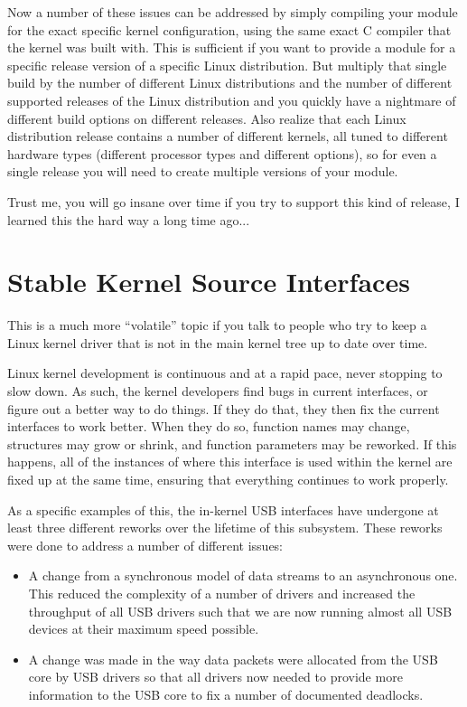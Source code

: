 \documentclass[a4paper,8pt,english]{sphinxmanual}
\begin{document}
Now a number of these issues can be addressed by simply compiling your
module for the exact specific kernel configuration, using the same exact
C compiler that the kernel was built with.  This is sufficient if you
want to provide a module for a specific release version of a specific
Linux distribution.  But multiply that single build by the number of
different Linux distributions and the number of different supported
releases of the Linux distribution and you quickly have a nightmare of
different build options on different releases.  Also realize that each
Linux distribution release contains a number of different kernels, all
tuned to different hardware types (different processor types and
different options), so for even a single release you will need to create
multiple versions of your module.

Trust me, you will go insane over time if you try to support this kind
of release, I learned this the hard way a long time ago...


\section{Stable Kernel Source Interfaces}
\label{process/stable-api-nonsense:stable-kernel-source-interfaces}
This is a much more ``volatile'' topic if you talk to people who try to
keep a Linux kernel driver that is not in the main kernel tree up to
date over time.

Linux kernel development is continuous and at a rapid pace, never
stopping to slow down.  As such, the kernel developers find bugs in
current interfaces, or figure out a better way to do things.  If they do
that, they then fix the current interfaces to work better.  When they do
so, function names may change, structures may grow or shrink, and
function parameters may be reworked.  If this happens, all of the
instances of where this interface is used within the kernel are fixed up
at the same time, ensuring that everything continues to work properly.

As a specific examples of this, the in-kernel USB interfaces have
undergone at least three different reworks over the lifetime of this
subsystem.  These reworks were done to address a number of different
issues:
\begin{itemize}
\item {} 
A change from a synchronous model of data streams to an asynchronous
one.  This reduced the complexity of a number of drivers and
increased the throughput of all USB drivers such that we are now
running almost all USB devices at their maximum speed possible.

\item {} 
A change was made in the way data packets were allocated from the
USB core by USB drivers so that all drivers now needed to provide
more information to the USB core to fix a number of documented
deadlocks.

\end{itemize}
\end{document}
